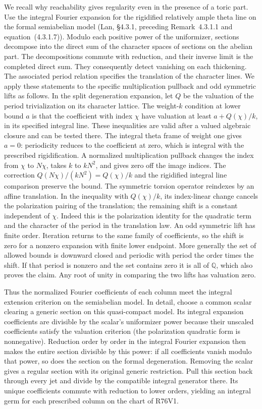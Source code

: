 We recall why reachability gives regularity even in the presence
of a toric part. Use the integral Fourier expansion for the
rigidified relatively ample theta line on the formal semiabelian
model (Lan, \S4.3.1, preceding Remark~4.3.1.1 and
equation~(4.3.1.7)). Modulo each positive power of the uniformizer,
sections decompose into the direct sum of the character spaces
of sections on the abelian part. The decompositions commute with
reduction, and their inverse limit is the completed direct sum.
They consequently detect vanishing on each thickening. The
associated period relation specifies the translation of the
character lines. We apply these statements to the specific
multiplication pullback and odd symmetric lifts as follows.
In the split degeneration expansion, let $Q$ be
the valuation of the period trivialization on its character
lattice. The weight-$k$ condition at lower bound $a$ is that
the coefficient with index $\chi$ have valuation at least
$a+Q(\chi)/k$, in its specified integral line. These inequalities
are valid after a valued algebraic closure and can be tested
there. The integral theta frame of weight one gives $a=0$:
periodicity reduces to the coefficient at zero, which is integral
with the prescribed rigidification. A normalized multiplication
pullback changes the index from $\chi$ to $N\chi$, takes $k$ to
$kN^2$, and gives zero off the image indices. The correction
$Q(N\chi)/(kN^2)=Q(\chi)/k$ and the rigidified integral line
comparison preserve the bound. The symmetric torsion operator
reindexes by an affine translation. In the inequality with
$Q(\chi)/k$, its index-linear change cancels the polarization
pairing of the translation; the remaining shift is a constant
independent of $\chi$. Indeed this is the polarization identity
for the quadratic term and the character of the period in the
translation law. An odd symmetric lift has finite order. Iteration
returns to the same family of coefficients, so the shift is zero
for a nonzero expansion with finite lower endpoint. More generally
the set of allowed bounds is downward closed and periodic with
period the order times the shift. If that period is nonzero and
the set contains zero it is all of $\mathbb Q$, which also proves
the claim. Any root of unity in comparing the two lifts has
valuation zero.

Thus the normalized Fourier coefficients of each column meet the
integral extension criterion on the semiabelian model. In detail,
choose a common scalar clearing a generic section on this
quasi-compact model. Its integral expansion coefficients are
divisible by the scalar's uniformizer power because their
unscaled coefficients satisfy the valuation criterion (the
polarization quadratic form is nonnegative). Reduction order by
order in the integral Fourier expansion then makes the entire
section divisible by this power: if all coefficients vanish
modulo that power, so does the section on the formal degeneration.
Removing the scalar gives a regular section with its original
generic restriction. Pull this section back through every jet and
divide by the compatible integral generator there. Its unique
coefficients commute with reduction to lower orders, yielding an
integral germ for each prescribed column on the chart of R76V1.

